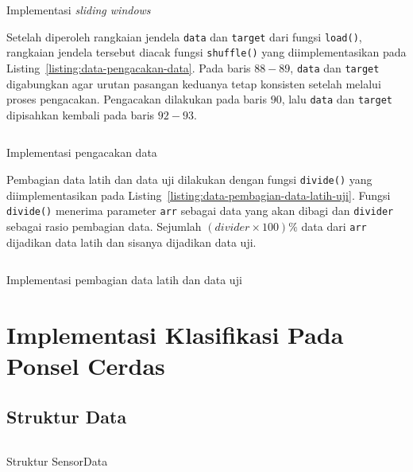 \begin{listing}[h]
    \inputminted[firstline=60,firstnumber=60,lastline=79]{python}{../har/data.py}
    \caption{Implementasi \textit{sliding windows}}
    \label{listing:data-sliding-window}
\end{listing}

Setelah diperoleh rangkaian jendela \texttt{data} dan \texttt{target} dari fungsi \texttt{load()}, rangkaian jendela tersebut diacak fungsi \texttt{shuffle()} yang diimplementasikan pada Listing~\ref{listing:data-pengacakan-data}. Pada baris $88-89$, \texttt{data} dan \texttt{target} digabungkan agar urutan pasangan keduanya tetap konsisten setelah melalui proses pengacakan. Pengacakan dilakukan pada baris $90$, lalu \texttt{data} dan \texttt{target} dipisahkan kembali pada baris $92-93$.

\begin{listing}[h]
    \inputminted[firstline=82,firstnumber=82,lastline=95]{python}{../har/data.py}
    \caption{Implementasi pengacakan data}
    \label{listing:data-pengacakan-data}
\end{listing}

Pembagian data latih dan data uji dilakukan dengan fungsi \texttt{divide()} yang diimplementasikan pada Listing~\ref{listing:data-pembagian-data-latih-uji}. Fungsi \texttt{divide()} menerima parameter \texttt{arr} sebagai data yang akan dibagi dan \texttt{divider} sebagai rasio pembagian data. Sejumlah $(divider \times 100) \%$ data dari \texttt{arr} dijadikan data latih dan sisanya dijadikan data uji.

\begin{listing}[h]
    \inputminted[firstline=98,firstnumber=98,lastline=107]{python}{../har/data.py}
    \caption{Implementasi pembagian data latih dan data uji}
    \label{listing:data-pembagian-data-latih-uji}
\end{listing}

\section{Implementasi Klasifikasi Pada Ponsel Cerdas}
\subsection{Struktur Data}

\begin{listing}[h]
    \inputminted[firstline=6,firstnumber=6,lastline=16]{java}{../aktvtas/app/src/main/java/org/elins/aktvtas/sensor/SensorData.java}
    \caption{Struktur SensorData}
    \label{listing:sensor-data}
\end{listing}

